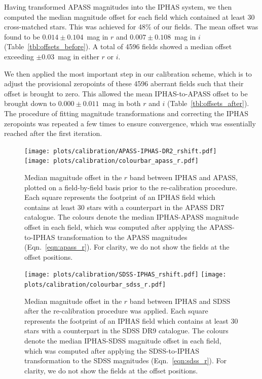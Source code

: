 \documentclass[useAMS,usenatbib]{mn2e}
\begin{document}
Having transformed APASS magnitudes into the IPHAS system,
we then computed the median magnitude offset 
for each field which contained at least 30 cross-matched stars.
This was achieved for 48\% of our fields.
The mean offset was found to be
$0.014\pm0.104$~mag in $r$ and $0.007\pm0.108$~mag in $i$
(Table~\ref{tbl:offsets_before}).
A total of 4596 fields showed a median offset
exceeding $\pm$0.03~mag in either $r$ or $i$.

We then applied the most important step in our calibration scheme,
which is to adjust the provisional zeropoints of these 4596 aberrant fields
such that their offset is brought to zero.
This allowed the mean IPHAS-to-APASS offset 
to be brought down to $0.000\pm0.011$~mag in both $r$ and $i$
(Table~\ref{tbl:offsets_after}).
The procedure of fitting magnitude transformations and
correcting the IPHAS zeropoints was repeated a few times to ensure 
convergence, which was essentially reached after the first iteration.

\begin{figure}
    \texttt{[image: plots/calibration/APASS-IPHAS-DR2\_rshift.pdf]} 
    \texttt{[image: plots/calibration/colourbar\_apass\_r.pdf]} 
    \caption{Median magnitude offset in the $r$ band between IPHAS and APASS,
             plotted on a field-by-field basis
             prior to the re-calibration procedure.
             Each square represents the footprint of an IPHAS field
             which contains at least 30 stars with a counterpart
             in the APASS DR7 catalogue.
             The colours denote the median
             IPHAS-APASS magnitude offset in each field,
             which was computed after applying the APASS-to-IPHAS
             transformation to the APASS magnitudes (Eqn.~\ref{eqn:apass_r}).
             For clarity, we do not show the fields at the offset positions.}
        \label{fig:apass_r}
    \vspace{1cm}
    \texttt{[image: plots/calibration/SDSS-IPHAS\_rshift.pdf]}
    \texttt{[image: plots/calibration/colourbar\_sdss\_r.pdf]} 
    \caption{Median magnitude offset in the $r$ band
             between IPHAS and SDSS after the re-calibration
             procedure was applied.
             Each square represents the footprint of an IPHAS field
             which contains at least 30 stars
             with a counterpart in the SDSS DR9 catalogue.
             The colours denote the median IPHAS-SDSS magnitude offset
             in each field,
             which was computed after applying the SDSS-to-IPHAS
             transformation to the SDSS magnitudes (Eqn.~\ref{eqn:sdss_r}).
             For clarity, we do not show the fields at the offset positions.}
    \label{fig:sdss_r}
\end{figure}
\end{document}
